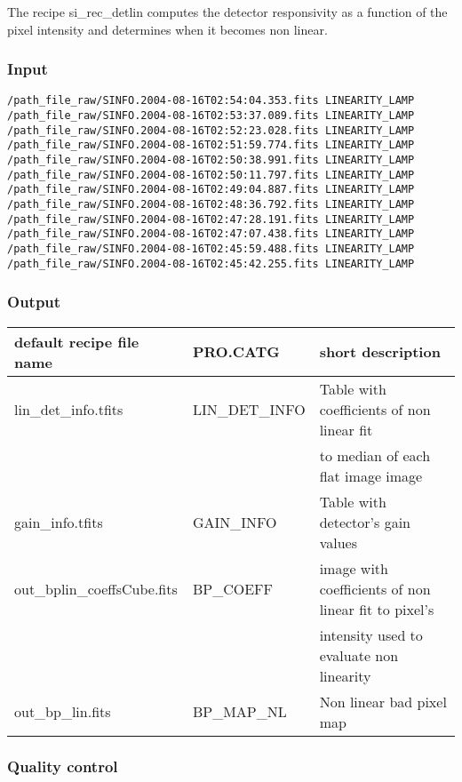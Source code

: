 The recipe si\_rec\_detlin computes the detector responsivity as a function
of the pixel intensity and determines when it becomes non linear. 

\subsubsection{Input}
\begin{verbatim}
/path_file_raw/SINFO.2004-08-16T02:54:04.353.fits LINEARITY_LAMP
/path_file_raw/SINFO.2004-08-16T02:53:37.089.fits LINEARITY_LAMP
/path_file_raw/SINFO.2004-08-16T02:52:23.028.fits LINEARITY_LAMP
/path_file_raw/SINFO.2004-08-16T02:51:59.774.fits LINEARITY_LAMP
/path_file_raw/SINFO.2004-08-16T02:50:38.991.fits LINEARITY_LAMP
/path_file_raw/SINFO.2004-08-16T02:50:11.797.fits LINEARITY_LAMP
/path_file_raw/SINFO.2004-08-16T02:49:04.887.fits LINEARITY_LAMP
/path_file_raw/SINFO.2004-08-16T02:48:36.792.fits LINEARITY_LAMP
/path_file_raw/SINFO.2004-08-16T02:47:28.191.fits LINEARITY_LAMP
/path_file_raw/SINFO.2004-08-16T02:47:07.438.fits LINEARITY_LAMP
/path_file_raw/SINFO.2004-08-16T02:45:59.488.fits LINEARITY_LAMP
/path_file_raw/SINFO.2004-08-16T02:45:42.255.fits LINEARITY_LAMP
\end{verbatim}


\subsubsection{Output}

\begin{longtable}{|*3{l|}}
\hline
default recipe file name     & PRO.CATG  & short description  \\
\hline
lin\_det\_info.tfits         & LIN\_DET\_INFO & Table with coefficients of non linear fit \\
                             &                & to median of each flat image image \\
gain\_info.tfits             & GAIN\_INFO     & Table with detector's gain values \\
out\_bplin\_coeffsCube.fits  & BP\_COEFF      & image with coefficients of non linear fit to pixel's \\
                             &                & intensity used to evaluate non linearity \\
out\_bp\_lin.fits            & BP\_MAP\_NL & Non linear bad pixel map \\
\hline
\end{longtable}

\subsubsection{Quality control}

